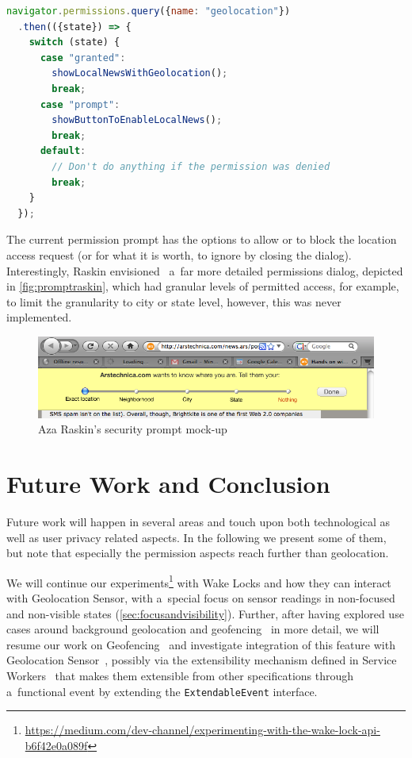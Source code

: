 \documentclass[sigconf,hyphens]{acmart}
\begin{document}
\begin{lstlisting}[caption={Asking for permission to use \texttt{GeolocationSensor}},
  label=code:prompt, language=JavaScript, float=h] 
navigator.permissions.query({name: "geolocation"})
  .then(({state}) => {
    switch (state) {
      case "granted":
        showLocalNewsWithGeolocation();
        break;
      case "prompt":
        showButtonToEnableLocalNews();
        break;
      default:
        // Don't do anything if the permission was denied
        break;
    }
  });
\end{lstlisting}

The current permission prompt has the options to allow or to block
the location access request (or for what it is worth, to ignore by closing the dialog).
Interestingly, Raskin envisioned~\cite{raskin2010geolocation} a~far more detailed permissions
dialog, depicted in \autoref{fig:promptraskin}, which had granular levels of permitted access,
for example, to limit the granularity to city or state level,
however, this was never implemented.

\begin{figure}[h]
  \includegraphics[width=\columnwidth]{mockup-prompt.png}
  \caption{Aza Raskin's security prompt mock-up~\cite{raskin2010geolocation}}
  \label{fig:promptraskin}
\end{figure}

\section{Future Work and Conclusion}

Future work will happen in several areas and touch upon both technological
as well as user privacy related aspects.
In the following we present some of them,
but note that especially the permission aspects reach further than geolocation.

We will continue our
experiments\footnote{\url{https://medium.com/dev-channel/experimenting-with-the-wake-lock-api-b6f42e0a089f}} 
with Wake Locks and how they can interact with Geolocation Sensor,
with a~special focus on sensor readings in non-focused and non-visible states (\autoref{sec:focusandvisibility}).
Further, after having explored use cases around background geolocation
and geofencing~\cite{kostiainen2018geolocation} in more detail,
we will resume our work on Geofencing~\cite{kruisselbrink2017geofencing}
and investigate integration of this feature with Geolocation Sensor~\cite{kostiainen2018geolocation},
possibly via the extensibility mechanism defined in Service Workers~\cite{russell2017serviceworkers}
that makes them extensible from other specifications through a~functional event
by extending the \texttt{ExtendableEvent} interface.
\end{document}
